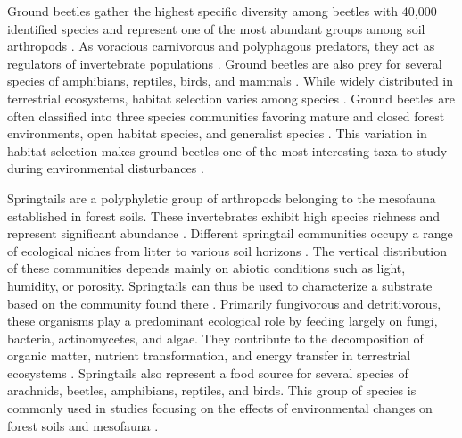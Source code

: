 Ground beetles gather the highest specific diversity among beetles with 40,000 identified species and represent one of the most abundant groups among soil arthropods \citep{Erwin1985taxonpulse,loveiEcologyBehaviorGround1996,Rochefort2006GroundBeetle}. 
As voracious carnivorous and polyphagous predators, they act as regulators of invertebrate populations \citep{loveiEcologyBehaviorGround1996}. 
Ground beetles are also prey for several species of amphibians, reptiles, birds, and mammals \citep{loveiEcologyBehaviorGround1996}. 
While widely distributed in terrestrial ecosystems, habitat selection varies among species \citep{Larochelle2003naturalhistory}. 
Ground beetles are often classified into three species communities favoring mature and closed forest environments, open habitat species, and generalist species \citep{Niemela2007effectsforestry}. 
This variation in habitat selection makes ground beetles one of the most interesting taxa to study during environmental disturbances \citep{bouchardBeetleCommunityResponse2016b,Halme1993Carabidbeetles,Heliola2001Distributioncarabid,koivulaBorealCarabidbeetleColeoptera2002a,Luff1992Classificationprediction,Niemela2001Carabidbeetles,Rainio2003Groundbeetles,Work2008Evaluationcarabid}.

Springtails are a polyphyletic group of arthropods belonging to the mesofauna established in forest soils. 
These invertebrates exhibit high species richness and represent significant abundance \citep{rusekBiodiversityCollembolaTheir1998}. 
Different springtail communities occupy a range of ecological niches from litter to various soil horizons \citep{pongeVerticalDistributionCollembola2000}. 
The vertical distribution of these communities depends mainly on abiotic conditions such as light, humidity, or porosity. 
Springtails can thus be used to characterize a substrate based on the community found there \citep{rusekBiodiversityCollembolaTheir1998}. 
Primarily fungivorous and detritivorous, these organisms play a predominant ecological role by feeding largely on fungi, bacteria, actinomycetes, and algae. 
They contribute to the decomposition of organic matter, nutrient transformation, and energy transfer in terrestrial ecosystems \citep{Cuchta2019importantrole,Hattenschwiler2005Biodiversitylitter,Marsden2020Howagroforestry,Petersen2000Collembolapopulations,rusekBiodiversityCollembolaTheir1998,Wolters1991SoilInvertebrates}. 
Springtails also represent a food source for several species of arachnids, beetles, amphibians, reptiles, and birds. 
This group of species is commonly used in studies focusing on the effects of environmental changes on forest soils and mesofauna \citep{farskaManagementIntensityAffects2014,rousseauWoodyBiomassRemoval2019,Salmon2008Relationshipssoil}.

